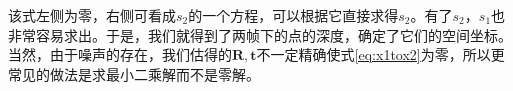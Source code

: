 该式左侧为零，右侧可看成$s_2$的一个方程，可以根据它直接求得$s_2$。有了$s_2$，$s_1$也非常容易求出。于是，我们就得到了两帧下的点的深度，确定了它们的空间坐标。当然，由于噪声的存在，我们估得的$\bm{R}, \bm{t}$不一定精确使式\eqref{eq:x1tox2}为零，所以更常见的做法是求最小二乘解而不是零解。

%
%
%
%
%
%
%
%


